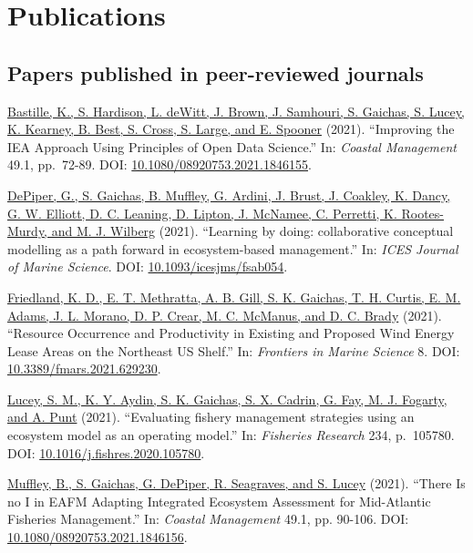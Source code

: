 \documentclass[11pt, a4paper]{awesome-cv}
\begin{document}
\hypertarget{publications}{%
\section{Publications}\label{publications}}

\hypertarget{papers-published-in-peer-reviewed-journals}{%
\subsection{Papers published in peer-reviewed
journals}\label{papers-published-in-peer-reviewed-journals}}

\protect\hyperlink{cite-bastille_improving_2021}{Bastille, K., S.
Hardison, L. deWitt, J. Brown, J. Samhouri, S. Gaichas, S. Lucey, K.
Kearney, B. Best, S. Cross, S. Large, and E. Spooner} (2021).
``Improving the IEA Approach Using Principles of Open Data Science.''
In: \emph{Coastal Management} 49.1, pp.~72-89. DOI:
\href{https://doi.org/10.1080\%2F08920753.2021.1846155}{10.1080/08920753.2021.1846155}.

\protect\hyperlink{cite-depiper_learning_2021}{DePiper, G., S. Gaichas,
B. Muffley, G. Ardini, J. Brust, J. Coakley, K. Dancy, G. W. Elliott, D.
C. Leaning, D. Lipton, J. McNamee, C. Perretti, K. Rootes-Murdy, and M.
J. Wilberg} (2021). ``Learning by doing: collaborative conceptual
modelling as a path forward in ecosystem-based management.'' In:
\emph{ICES Journal of Marine Science}. DOI:
\href{https://doi.org/10.1093\%2Ficesjms\%2Ffsab054}{10.1093/icesjms/fsab054}.

\protect\hyperlink{cite-friedland_resource_2021}{Friedland, K. D., E. T.
Methratta, A. B. Gill, S. K. Gaichas, T. H. Curtis, E. M. Adams, J. L.
Morano, D. P. Crear, M. C. McManus, and D. C. Brady} (2021). ``Resource
Occurrence and Productivity in Existing and Proposed Wind Energy Lease
Areas on the Northeast US Shelf.'' In: \emph{Frontiers in Marine
Science} 8. DOI:
\href{https://doi.org/10.3389\%2Ffmars.2021.629230}{10.3389/fmars.2021.629230}.

\protect\hyperlink{cite-lucey_evaluating_2021}{Lucey, S. M., K. Y.
Aydin, S. K. Gaichas, S. X. Cadrin, G. Fay, M. J. Fogarty, and A. Punt}
(2021). ``Evaluating fishery management strategies using an ecosystem
model as an operating model.'' In: \emph{Fisheries Research} 234,
p.~105780. DOI:
\href{https://doi.org/10.1016\%2Fj.fishres.2020.105780}{10.1016/j.fishres.2020.105780}.

\protect\hyperlink{cite-muffley_there_2021}{Muffley, B., S. Gaichas, G.
DePiper, R. Seagraves, and S. Lucey} (2021). ``There Is no I in EAFM
Adapting Integrated Ecosystem Assessment for Mid-Atlantic Fisheries
Management.'' In: \emph{Coastal Management} 49.1, pp. 90-106. DOI:
\href{https://doi.org/10.1080\%2F08920753.2021.1846156}{10.1080/08920753.2021.1846156}.
\end{document}

